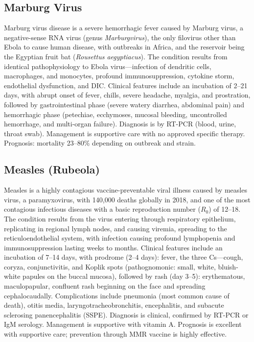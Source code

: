 \subsection{Marburg Virus}
\label{sec:Marburg Virus}
Marburg virus disease is a severe hemorrhagic fever caused by Marburg virus, a negative-sense RNA virus (genus \textit{Marburgvirus}), the only filovirus other than Ebola to cause human disease, with outbreaks in Africa, and the reservoir being the Egyptian fruit bat (\textit{Rousettus aegyptiacus}). The condition results from identical pathophysiology to Ebola virus---infection of dendritic cells, macrophages, and monocytes, profound immunosuppression, cytokine storm, endothelial dysfunction, and DIC. Clinical features include an incubation of 2--21 days, with abrupt onset of fever, chills, severe headache, myalgia, and prostration, followed by gastrointestinal phase (severe watery diarrhea, abdominal pain) and hemorrhagic phase (petechiae, ecchymoses, mucosal bleeding, uncontrolled hemorrhage, and multi-organ failure). Diagnosis is by RT-PCR (blood, urine, throat swab). Management is supportive care with no approved specific therapy. Prognosis: mortality 23--80\% depending on outbreak and strain.

\subsection{Measles (Rubeola)}
\label{sec:Measles}
Measles is a highly contagious vaccine-preventable viral illness caused by measles virus, a paramyxovirus, with 140,000 deaths globally in 2018, and one of the most contagious infectious diseases with a basic reproduction number ($R_0$) of 12--18. The condition results from the virus entering through respiratory epithelium, replicating in regional lymph nodes, and causing viremia, spreading to the reticuloendothelial system, with infection causing profound lymphopenia and immunosuppression lasting weeks to months. Clinical features include an incubation of 7--14 days, with prodrome (2--4 days): fever, the three Cs---cough, coryza, conjunctivitis, and Koplik spots (pathognomonic: small, white, bluish-white papules on the buccal mucosa), followed by rash (day 3--5): erythematous, maculopapular, confluent rash beginning on the face and spreading cephalocaudally. Complications include pneumonia (most common cause of death), otitis media, laryngotracheobronchitis, encephalitis, and subacute sclerosing panencephalitis (SSPE). Diagnosis is clinical, confirmed by RT-PCR or IgM serology. Management is supportive with vitamin A. Prognosis is excellent with supportive care; prevention through MMR vaccine is highly effective.

